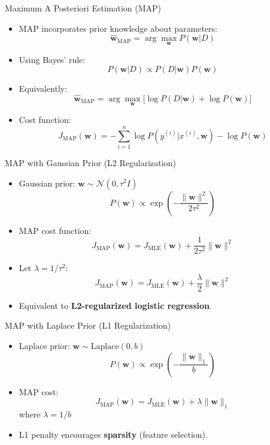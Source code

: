\documentclass[serif, aspectratio=169]{beamer}
\begin{document}
    \begin{frame}{Maximum A Posteriori Estimation (MAP)}
        \begin{itemize}
            \item MAP incorporates prior knowledge about parameters:
            \[
                \hat{\mathbf{w}}_{\text{MAP}} = \arg\max_{\mathbf{w}} P(\mathbf{w}|D)
            \]
            \item Using Bayes’ rule:
            \[
                P(\mathbf{w}|D) \propto P(D|\mathbf{w})P(\mathbf{w})
            \]
            \item Equivalently:
            \[
                \hat{\mathbf{w}}_{\text{MAP}} = \arg\max_{\mathbf{w}} \Big[ \log P(D|\mathbf{w}) + \log P(\mathbf{w}) \Big]
            \]
            \item Cost function:
            \[
                J_{\text{MAP}}(\mathbf{w}) = - \sum_{i=1}^n \log P(y^{(i)}|x^{(i)}, \mathbf{w}) - \log P(\mathbf{w})
            \]
        \end{itemize}
    \end{frame}

    \begin{frame}{MAP with Gaussian Prior (L2 Regularization)}
        \begin{itemize}
            \item Gaussian prior: $\mathbf{w} \sim \mathcal{N}(0, \tau^2 I)$
            \[
                P(\mathbf{w}) \propto \exp\left(-\frac{\|\mathbf{w}\|^2}{2\tau^2}\right)
            \]
            \item MAP cost function:
            \[
                J_{\text{MAP}}(\mathbf{w}) = J_{\text{MLE}}(\mathbf{w}) + \frac{1}{2\tau^2}\|\mathbf{w}\|^2
            \]
            \item Let $\lambda = 1/\tau^2$:
            \[
                J_{\text{MAP}}(\mathbf{w}) = J_{\text{MLE}}(\mathbf{w}) + \frac{\lambda}{2}\|\mathbf{w}\|^2
            \]
            \item Equivalent to \textbf{L2-regularized logistic regression}.
        \end{itemize}
    \end{frame}

    \begin{frame}{MAP with Laplace Prior (L1 Regularization)}
        \begin{itemize}
            \item Laplace prior: $\mathbf{w} \sim \text{Laplace}(0, b)$
            \[
                P(\mathbf{w}) \propto \exp\left(-\frac{\|\mathbf{w}\|_1}{b}\right)
            \]
            \item MAP cost:
            \[
                J_{\text{MAP}}(\mathbf{w}) = J_{\text{MLE}}(\mathbf{w}) + \lambda \|\mathbf{w}\|_1
            \]
            where $\lambda = 1/b$
            \item L1 penalty encourages \textbf{sparsity} (feature selection).
        \end{itemize}
    \end{frame}
\end{document}
